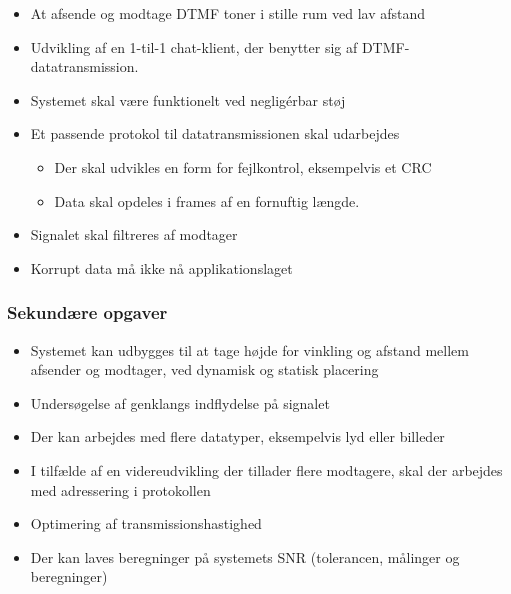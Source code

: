 \begin{itemize}[noitemsep]
  \item At afsende og modtage DTMF toner i stille rum ved lav afstand
  \item Udvikling af en 1-til-1 chat-klient, der benytter sig af DTMF-datatransmission.
  \item Systemet skal være funktionelt ved negligérbar støj
  \item Et passende protokol til datatransmissionen skal udarbejdes
  \begin{itemize}[noitemsep]
    \item Der skal udvikles en form for fejlkontrol, eksempelvis et CRC
    \item Data skal opdeles i frames af en fornuftig længde.
  \end{itemize}
  \item Signalet skal filtreres af modtager
  \item Korrupt data må ikke nå applikationslaget
\end{itemize}

\subsubsection{Sekundære opgaver}

\begin{itemize}[noitemsep]
\item Systemet kan udbygges til at tage højde for vinkling og afstand mellem afsender og modtager, ved dynamisk og statisk placering
\item Undersøgelse af genklangs indflydelse på signalet
\item Der kan arbejdes med flere datatyper, eksempelvis lyd eller billeder
\item I tilfælde af en videreudvikling der tillader flere modtagere, skal der arbejdes med adressering i protokollen
\item Optimering af transmissionshastighed
\item Der kan laves beregninger på systemets SNR (tolerancen, målinger og beregninger)
\end{itemize}